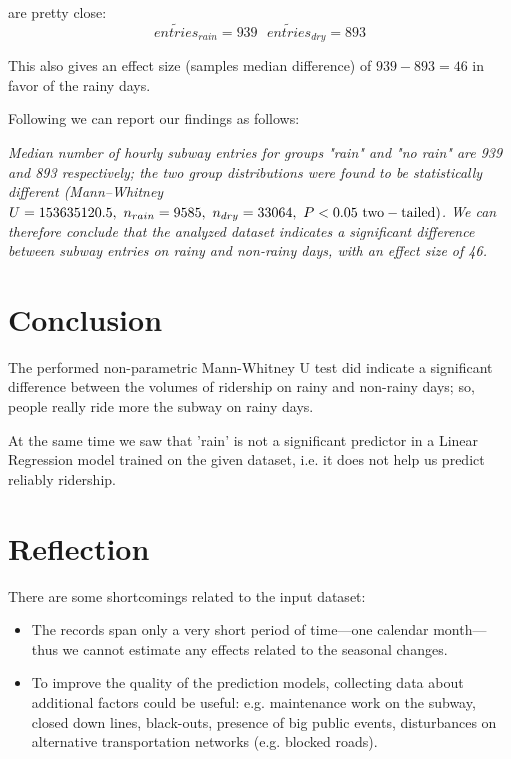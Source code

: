 \documentclass{article}
\begin{document}
are pretty close: 
$$\widetilde{entries}_{rain} = 939 \ \ \ \widetilde{entries}_{dry} = 893$$

This also gives an effect size (samples median difference) of $939-893=46$ in favor of the rainy days.

Following \cite{wiki_mwu} we can report our findings as follows:

\textit{Median number of hourly subway entries for groups "rain" and "no rain" are 939 and 893 respectively; the two group distributions were found to be statistically different (Mann–Whitney $U = 153635120.5,\ n_{rain} = 9585,\ n_{dry} = 33064,\ P < 0.05\ \rm two-tailed)$. We can therefore conclude that the analyzed dataset indicates a significant difference between subway entries on rainy and non-rainy days, with an effect size of 46.}


\section{Conclusion}

The performed non-parametric Mann-Whitney U test did indicate a significant difference between the volumes of ridership on rainy and non-rainy days; so, people really ride more the subway on rainy days.

At the same time we saw that 'rain' is not a significant predictor in a Linear Regression model trained on the given dataset, i.e. it does not help us predict reliably ridership.

\section{Reflection}

There are some shortcomings related to the input dataset:
\begin{itemize}
\item The records span only a very short period of time---one calendar month---thus we cannot estimate any effects related to the seasonal changes.
\item To improve the quality of the prediction models, collecting data about additional factors could be useful: e.g. maintenance work on the subway, closed down lines, black-outs, presence of big public events, disturbances on alternative transportation networks (e.g. blocked roads).
\end{itemize}

\medskip

\printbibliography
\end{document}
